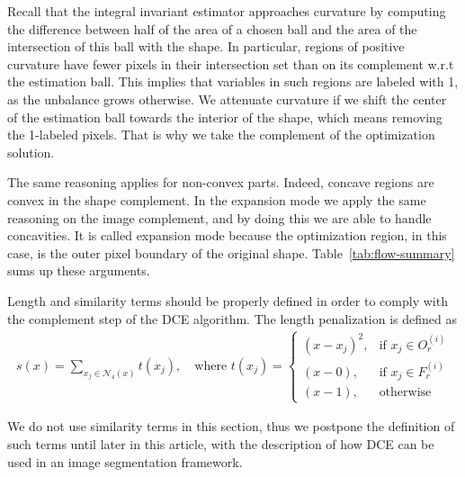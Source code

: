 \documentclass[smallextended]{svjour3}       %
\begin{document}
Recall that the integral invariant estimator approaches curvature by computing the difference between half of the area
of a chosen ball and the area of the intersection of this ball with the shape.  In particular, regions of positive
curvature have fewer pixels in their intersection set than on its complement w.r.t the estimation ball. This implies
that variables in such regions are labeled with 1, as the unbalance grows otherwise. We attenuate curvature if we shift
the center of the estimation ball towards the interior of the shape, which means removing the 1-labeled pixels. That is
why we take the complement of the optimization solution.

The same reasoning applies for non-convex parts. Indeed, concave regions are convex in the shape complement. In the
expansion mode we apply the same reasoning on the image complement, and by doing this we are able to handle
concavities. It is called expansion mode because the optimization region, in this case, is the outer pixel boundary of
the original shape. Table~\ref{tab:flow-summary} sums up these arguments.

Length and similarity terms should be properly defined in order to comply with the complement step of the DCE
algorithm. The length penalization is defined as
\begin{align}
  s(x)=\sum_{x_j \in \mathcal{N}_4(x)}{ t(x_j) }, \quad \text{where } t(x_j) = \left\{\begin{array}{ll}
  (x-x_j)^2, & \text{if } x_j \in O_{r}^{(i)}\\
  (x-0), & \text{if } x_j \in F_{r}^{(i)}\\
  (x-1), & \text{otherwise }
  \end{array}\right.
  \label{eq:length-penalization}
\end{align}
	
We do not use similarity terms in this section, thus we postpone the definition of such terms until later in this
article, with the description of how DCE can be used in an image segmentation framework.
\end{document}
